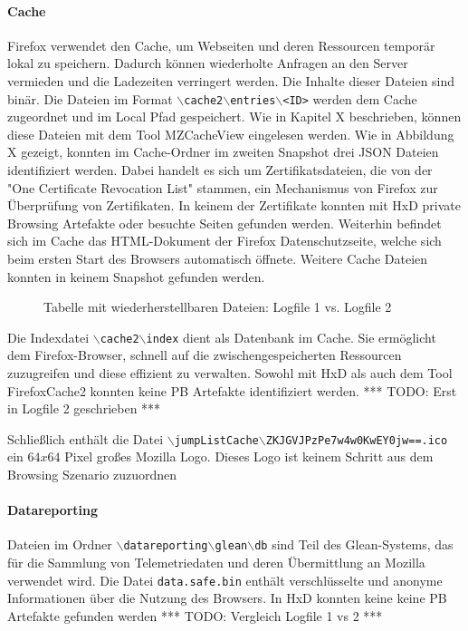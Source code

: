 \begin{appendices}
\paragraph*{Cache}
Firefox verwendet den Cache, um Webseiten und deren Ressourcen temporär lokal zu speichern. Dadurch können wiederholte Anfragen an den Server vermieden und die Ladezeiten verringert werden. Die Inhalte dieser Dateien sind binär.
Die Dateien im Format \texttt{$\backslash$cache2$\backslash$entries$\backslash$<ID>} werden dem Cache zugeordnet und im Local Pfad gespeichert.
Wie in Kapitel X beschrieben, können diese Dateien mit dem Tool MZCacheView eingelesen werden.
Wie in Abbildung X gezeigt, konnten im Cache-Ordner im zweiten Snapshot drei JSON Dateien identifiziert werden. Dabei handelt es sich um Zertifikatsdateien, die von der "One Certificate Revocation List" stammen, ein Mechanismus von Firefox zur Überprüfung von Zertifikaten. In keinem der Zertifikate konnten mit HxD private Browsing Artefakte oder besuchte Seiten gefunden werden.
Weiterhin befindet sich im Cache das HTML-Dokument der Firefox Datenschutzseite, welche sich beim ersten Start des Browsers automatisch öffnete. %
Weitere Cache Dateien konnten in keinem Snapshot gefunden werden.
\begin{figure}[h!]
	\caption{Tabelle mit wiederherstellbaren Dateien: Logfile 1 vs. Logfile 2}
\end{figure}
Die Indexdatei \texttt{$\backslash$cache2$\backslash$index} dient als Datenbank im Cache. Sie ermöglicht dem Firefox-Browser, schnell auf die zwischengespeicherten Ressourcen zuzugreifen und diese effizient zu verwalten. Sowohl mit HxD als auch dem Tool FirefoxCache2 konnten keine PB Artefakte identifiziert werden.
*** TODO: Erst in Logfile 2 geschrieben ***

Schließlich enthält die Datei \texttt{$\backslash$jumpListCache$\backslash$ZKJGVJPzPe7w4w0KwEY0jw==.ico} ein $64x64$ Pixel großes Mozilla Logo. Dieses Logo ist keinem Schritt aus dem Browsing Szenario zuzuordnen


\paragraph*{Datareporting}
Dateien im Ordner \texttt{$\backslash$datareporting$\backslash$glean$\backslash$db} sind Teil des Glean-Systems, das für die Sammlung von Telemetriedaten und deren Übermittlung an Mozilla verwendet wird. 
Die Datei \texttt{data.safe.bin} enthält verschlüsselte und anonyme Informationen über die Nutzung des Browsers. In HxD konnten keine keine PB Artefakte gefunden werden
*** TODO: Vergleich Logfile 1 vs 2 ***


\end{appendices}
